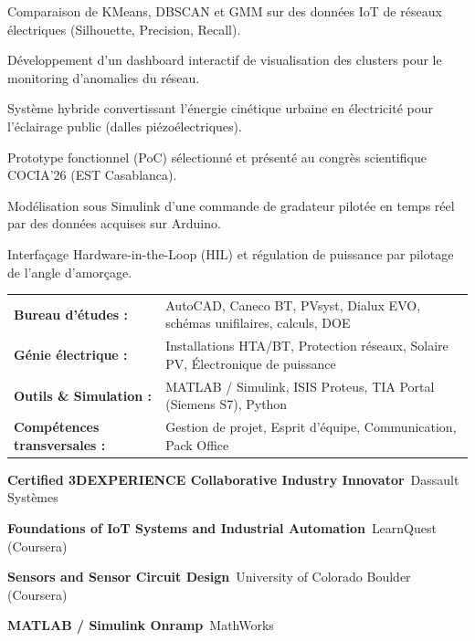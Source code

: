 \documentclass[10pt,a4paper]{../altacv}
\begin{document}
\begin{cvitems}
  \item Comparaison de KMeans, DBSCAN et GMM sur des données IoT de réseaux électriques (Silhouette, Precision, Recall).
  \item Développement d’un dashboard interactif de visualisation des clusters pour le monitoring d’anomalies du réseau.
\end{cvitems}
\vspace{2pt}
\begin{cvitems}
  \item Système hybride convertissant l’énergie cinétique urbaine en électricité pour l’éclairage public (dalles piézoélectriques).
  \item Prototype fonctionnel (PoC) sélectionné et présenté au congrès scientifique COCIA’26 (EST Casablanca).
\end{cvitems}
\vspace{2pt}
\begin{cvitems}
  \item Modélisation sous Simulink d’une commande de gradateur pilotée en temps réel par des données acquises sur Arduino.
  \item Interfaçage Hardware-in-the-Loop (HIL) et régulation de puissance par pilotage de l’angle d’amorçage.
\end{cvitems}

\begin{tabular}{@{}ll@{}}
\textbf{Bureau d’études :} & AutoCAD, Caneco BT, PVsyst, Dialux EVO, schémas unifilaires, calculs, DOE \\[1.5pt]
\textbf{Génie électrique :} & Installations HTA/BT, Protection réseaux, Solaire PV, Électronique de puissance \\[1.5pt]
\textbf{Outils \& Simulation :} & MATLAB / Simulink, ISIS Proteus, TIA Portal (Siemens S7), Python \\[1.5pt]
\textbf{Compétences transversales :} & Gestion de projet, Esprit d’équipe, Communication, Pack Office
\end{tabular}

\begin{cvitems}
  \item \textbf{Certified 3DEXPERIENCE Collaborative Industry Innovator}~\hfill {\color{emphasis}Dassault Systèmes}
  \item \textbf{Foundations of IoT Systems and Industrial Automation}~\hfill {\color{emphasis}LearnQuest (Coursera)}
  \item \textbf{Sensors and Sensor Circuit Design}~\hfill {\color{emphasis}University of Colorado Boulder (Coursera)}
  \item \textbf{MATLAB / Simulink Onramp}~\hfill {\color{emphasis}MathWorks}
\end{cvitems}

\cvactivites
\cvlangues
\end{document}
